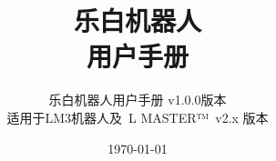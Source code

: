\documentclass[UTF8, hyperref]{ctexrep}
\newcommand{\LM}{~{\sf L MASTER™}~}
\begin{document}
\title{乐白机器人\\
用户手册
}
\author{乐白机器人用户手册 v1.0.0版本\\
适用于LM3机器人及\LM v2.x 版本
}
\date{\today}
\maketitle %
\tableofcontents
\appendix
\listoftables %
\listoffigures %
\printindex %
\end{document}
